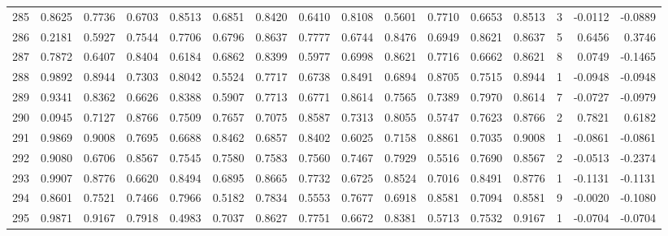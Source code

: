 \begin{tabular}{lrrrrrrrrrrrrrrr}
285 &      0.8625 &  0.7736 &  0.6703 &  0.8513 &  0.6851 &  0.8420 &  0.6410 &  0.8108 &  0.5601 &  0.7710 &   0.6653 &     0.8513 &      3 &                   -0.0112 &                    -0.0889 \\
286 &      0.2181 &  0.5927 &  0.7544 &  0.7706 &  0.6796 &  0.8637 &  0.7777 &  0.6744 &  0.8476 &  0.6949 &   0.8621 &     0.8637 &      5 &                    0.6456 &                     0.3746 \\
287 &      0.7872 &  0.6407 &  0.8404 &  0.6184 &  0.6862 &  0.8399 &  0.5977 &  0.6998 &  0.8621 &  0.7716 &   0.6662 &     0.8621 &      8 &                    0.0749 &                    -0.1465 \\
288 &      0.9892 &  0.8944 &  0.7303 &  0.8042 &  0.5524 &  0.7717 &  0.6738 &  0.8491 &  0.6894 &  0.8705 &   0.7515 &     0.8944 &      1 &                   -0.0948 &                    -0.0948 \\
289 &      0.9341 &  0.8362 &  0.6626 &  0.8388 &  0.5907 &  0.7713 &  0.6771 &  0.8614 &  0.7565 &  0.7389 &   0.7970 &     0.8614 &      7 &                   -0.0727 &                    -0.0979 \\
290 &      0.0945 &  0.7127 &  0.8766 &  0.7509 &  0.7657 &  0.7075 &  0.8587 &  0.7313 &  0.8055 &  0.5747 &   0.7623 &     0.8766 &      2 &                    0.7821 &                     0.6182 \\
291 &      0.9869 &  0.9008 &  0.7695 &  0.6688 &  0.8462 &  0.6857 &  0.8402 &  0.6025 &  0.7158 &  0.8861 &   0.7035 &     0.9008 &      1 &                   -0.0861 &                    -0.0861 \\
292 &      0.9080 &  0.6706 &  0.8567 &  0.7545 &  0.7580 &  0.7583 &  0.7560 &  0.7467 &  0.7929 &  0.5516 &   0.7690 &     0.8567 &      2 &                   -0.0513 &                    -0.2374 \\
293 &      0.9907 &  0.8776 &  0.6620 &  0.8494 &  0.6895 &  0.8665 &  0.7732 &  0.6725 &  0.8524 &  0.7016 &   0.8491 &     0.8776 &      1 &                   -0.1131 &                    -0.1131 \\
294 &      0.8601 &  0.7521 &  0.7466 &  0.7966 &  0.5182 &  0.7834 &  0.5553 &  0.7677 &  0.6918 &  0.8581 &   0.7094 &     0.8581 &      9 &                   -0.0020 &                    -0.1080 \\
295 &      0.9871 &  0.9167 &  0.7918 &  0.4983 &  0.7037 &  0.8627 &  0.7751 &  0.6672 &  0.8381 &  0.5713 &   0.7532 &     0.9167 &      1 &                   -0.0704 &                    -0.0704 \\

\end{tabular}
